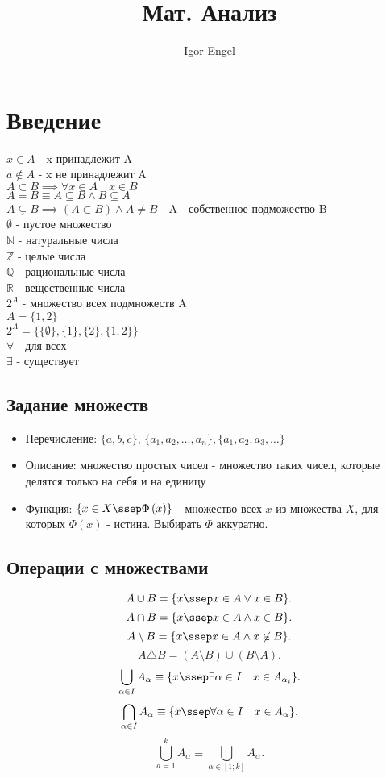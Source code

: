 \documentclass[11pt, oneside]{article}   	%
\title{Мат. Анализ}
\author{Igor Engel}
\date{}
\begin{document}
\maketitle
\section{Введение}
    $x \in A$ - x принадлежит A\\
    $a \not\in A$ - x не принадлежит A\\
    $A \subset B \implies \forall{x \in A}\quad x \in B$\\
    $A = B \equiv A \subseteq B\land B \subseteq A$\\
    $A \subsetneq B \implies (A\subset B)\land A\neq B$ - A - собственное подможество B\\
    $\emptyset$ - пустое множество\\
    $\mathbb{N}$ - натуральные числа\\
    $\mathbb{Z}$ - целые числа\\
    $\mathbb{Q}$ - рациональные числа\\
    $\mathbb{R}$ - вещественные числа\\
    $2^A$ - множество всех подмножеств A\\
    $A = \{1, 2\}$\\
    $2^{A} = \{\{\emptyset\}, \{1\}, \{2\}, \{1, 2\}\}$\\
    $\forall$ - для всех\\
    $\exists$ - существует
    \subsection{Задание множеств}
    \begin{itemize}
        \item Перечисление: $\{a, b, c\}$, $\{a_1, a_2, \ldots, a_n\},  \{a_1, a_2, a_3, \ldots\}  $ 
        \item Описание: множество простых чисел - множество таких чисел, которые делятся только на себя и на единицу
        \item Функция: $\{x \in X\ssep \Phi\left( x \right) \} $ - множество всех $x$ из множества $X$, для которых  $\Phi\left( x \right) $ - истина. Выбирать $\Phi$ аккуратно.
    \end{itemize}
    \subsection{Операции с множествами}
        \[ A\cup B = \{x\ssep x \in A \lor x \in B\}  .\]
        \[ A\cap B = \{x\ssep x \in A\land x \in B\}  .\] 
        \[ A\setminus B = \{x\ssep x \in A\land x \not\in B\}   .\] 
        \[ A\triangle B = \left( A\setminus B  \right)\cup\left( B\setminus A \right)   .\]
        \[ \bigcup\limits_{\alpha \in I}A_{\alpha} \equiv \{x \ssep \exists{\alpha \in I}\quad x \in A_{\alpha_i}\} .\]
        \[ \bigcap\limits_{\alpha \in I}A_{\alpha} \equiv \{x \ssep \forall{\alpha \in I}\quad x \in A_{\alpha}\}  .\] 
        \[ \bigcup\limits_{a=1}^kA_{\alpha} \equiv \bigcup\limits_{\alpha \in \left[1; k\right]}A_{\alpha} .\]
\end{document}
